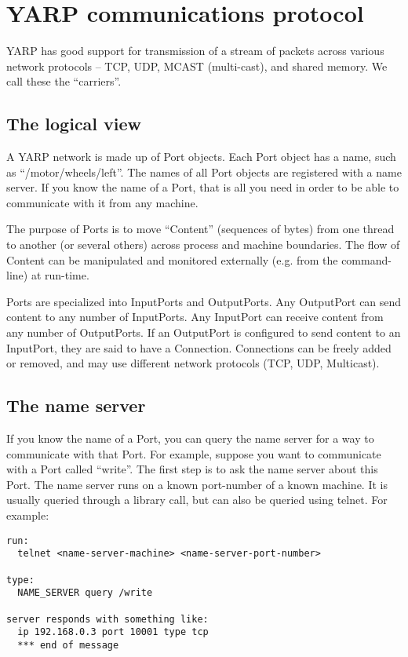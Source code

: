 
\section{YARP communications protocol}

YARP has good support for transmission of a stream of packets
across various network protocols -- TCP, UDP, MCAST (multi-cast),
and shared memory.  We call these the ``carriers''.

\subsection{The logical view}

A YARP network is made up of Port objects.  Each Port object has
a name, such as ``/motor/wheels/left''.  The names of all Port
objects are registered with a name server.  If you know the name
of a Port, that is all you need in order to be able to 
communicate with it from any machine.

The purpose of Ports is to move ``Content'' (sequences of bytes) from
one thread to another (or several others) across process and machine
boundaries.  The flow of Content can be manipulated and monitored
externally (e.g. from the command-line) at run-time.

Ports are specialized into InputPorts and OutputPorts.
Any OutputPort can send content to any number of InputPorts.  Any
InputPort can receive content from any number of OutputPorts.  If an
OutputPort is configured to send content to an InputPort, they are
said to have a Connection.  Connections can be freely added or 
removed, and may use different network protocols (TCP, UDP, Multicast).




\subsection{The name server}

If you know the name
of a Port, you can query the name server for a way to communicate
with that Port.
For example, suppose you want to communicate with a Port called
``write''.  The first step is to ask the name server about this
Port.  The name server runs on a known port-number of a known machine.
It is usually queried through a library call, but can also be
queried using telnet.  For example:

\begin{verbatim}
run:
  telnet <name-server-machine> <name-server-port-number>

type:
  NAME_SERVER query /write

server responds with something like:
  ip 192.168.0.3 port 10001 type tcp
  *** end of message
\end{verbatim}

